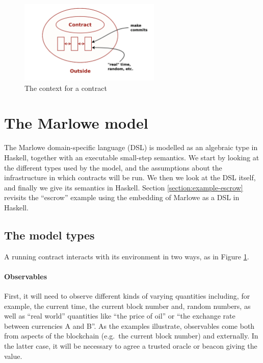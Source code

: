 \documentclass[runningheads]{llncs}
\begin{document}
\begin{figure}[t]
\begin{center}
\includegraphics[width=0.6\textwidth]{pix/context.png}
\caption{The context for a contract}
\label{fig:context}
\end{center}
\vspace*{-8mm}
\end{figure}


\section{The Marlowe model}
\label{section:model}

The Marlowe domain-specific language (DSL) is modelled as an algebraic type in Haskell, together with an executable 
small-step semantics. We start by looking at the different types used by the model, and the assumptions about the 
infrastructure in which contracts will be run. We then we look at the  DSL itself, 
and finally we give its semantics in Haskell. Section 
\ref{section:example-escrow} revisits the ``escrow'' example using the embedding of Marlowe as a DSL in Haskell.

\subsection{The model types}

A running contract interacts with its environment in two ways, as in Figure \ref{fig:context}.

\paragraph{Observables}


First, it will need to observe different kinds of varying quantities including, for example, the current time, the 
current block number and, random numbers, as well as ``real world'' quantities like ``the price of oil'' or ``the 
exchange rate between currencies A and B''. 
As the examples illustrate, observables come both from aspects of the blockchain (e.g.\ the current block number) and 
externally. In the latter case, it will be necessary to agree a trusted oracle or beacon giving the value.
\end{document}
